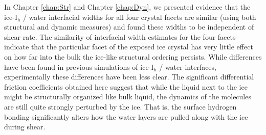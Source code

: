 In Chapter \ref{chap:Str} and Chapter \ref{chap:Dyn}, we presented
evidence that the ice-I$_\mathrm{h}$ / water interfacial widths for
all four crystal facets are similar (using both structural and dynamic
measures) and found these widths to be independent of shear rate.  The
similarity of interfacial width estimates for the four facets indicate
that the particular facet of the exposed ice crystal has very little
effect on how far into the bulk the ice-like structural ordering
persists. While differences have been found in previous simulations of
ice-I$_\mathrm{h}$ / water interfaces,\cite{Hayward2001,Hayward2002}
experimentally these differences have been less
clear.\cite{Beaglehole1993} The significant differential friction
coefficients obtained here suggest that while the liquid next to the
ice might be structurally organized like bulk liquid, the dynamics of
the molecules are still quite strongly perturbed by the ice.  That is,
the surface hydrogen bonding significantly alters how the water layers
are pulled along with the ice during shear.


